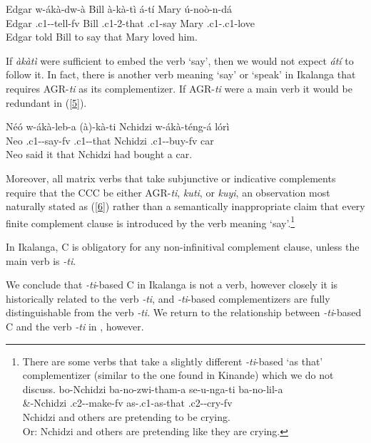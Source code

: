 \documentclass[output=paper,
modfonts
]{langscibook}
\begin{document}
\ea \gll Edgar w-ákà-dw-à  Bill à-kà-tì  á-tí  Mary 	ú-noò-n-dá\\
        Edgar .c1--tell-fv Bill .c1-2-that .c1-say Mary  .c1-.c1-love\\
       \glt Edgar told Bill to say that Mary loved him.
       \z 
       
If \textit{àkàtì} were sufficient to embed the verb `say', then we would not expect \textit{átí} to follow it. In fact, there is another verb meaning `say' or `speak' in Ikalanga that requires AGR-\textit{ti} as its complementizer. If AGR-\textit{ti} were a main verb it would be redundant in (\ref{5}).

\ea\label{5} \gll Néó w-ákà-leb-a    (à)-kà-ti  Nchidzi w-ákà-téng-á  lórì\\
         Neo .c1--say-fv  .c1--that Nchidzi .c1--buy-fv car\\
     \glt  Neo said it that Nchidzi had bought a car.
            \z
            
Moreover, all matrix verbs that take subjunctive or indicative complements require that the CCC be either AGR-\textit{ti}, \textit{kuti}, or \textit{kuyi}, an observation most naturally stated as (\ref{6}) rather than a semantically inappropriate claim that every finite complement clause is introduced by the verb meaning `say'.\footnote{There are some verbs that take a slightly different \textit{-ti}-based `as that' complementizer (similar to the one found in Kinande) which we do not discuss.
\ea \gll bo-Nchidzi  ba-no-zwi-tham-a  se-u-nga-ti	  ba-no-lil-a\\
      \&-Nchidzi   .c2--make-fv  as-.c1-as-that  .c2--cry-fv\\
     \glt Nchidzi and others are pretending to be crying. \\
     Or: Nchidzi and others are pretending like they are crying.\z}  

\ea \label{6}
\textup{In Ikalanga, C is obligatory for any non-infinitival complement clause, unless the 	main verb is} \textit{-ti}.
\z

We conclude that \textit{-ti}-based C in Ikalanga is not a verb, however closely it is historically related to the verb \textit{-ti}, and \textit{-ti}-based complementizers are fully distinguishable from the verb \textit{-ti}. We return to the relationship between \textit{-ti}-based C and the verb \textit{-ti} in , however. 
\end{document}
